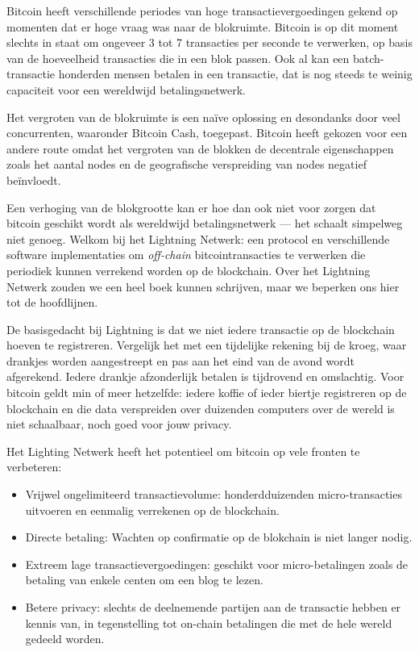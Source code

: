 \documentclass[smalldemyvopaper,11pt,twoside,onecolumn,openright,extrafontsizes]{memoir}
\begin{document}
Bitcoin heeft verschillende periodes van hoge transactievergoedingen gekend op momenten dat er hoge vraag was naar de blokruimte. Bitcoin is op dit moment slechts in staat om ongeveer 3 tot 7 transacties per seconde te verwerken, op basis van de hoeveelheid transacties die in een blok passen. Ook al kan een batch-transactie honderden mensen betalen in een transactie, dat is nog steeds te weinig capaciteit voor een wereldwijd betalingsnetwerk.    

Het vergroten van de blokruimte is een naïve oplossing en desondanks door veel concurrenten, waaronder Bitcoin Cash, toegepast. Bitcoin heeft gekozen voor een andere route omdat het vergroten van de blokken de decentrale eigenschappen zoals het aantal nodes en de geografische verspreiding van nodes negatief beïnvloedt. 

Een verhoging van de blokgrootte kan er hoe dan ook niet voor zorgen dat bitcoin geschikt wordt als wereldwijd betalingsnetwerk --- het schaalt simpelweg niet genoeg. Welkom bij het Lightning Netwerk: een protocol en verschillende software implementaties om \textit{off-chain} bitcointransacties te verwerken die periodiek kunnen verrekend worden op de blockchain. Over het Lightning Netwerk zouden we een heel boek kunnen schrijven, maar we beperken ons hier tot de hoofdlijnen.

De basisgedacht bij Lightning is dat we niet iedere transactie op de blockchain hoeven te registreren. Vergelijk het met een tijdelijke rekening bij de kroeg, waar drankjes worden aangestreept en pas aan het eind van de avond wordt afgerekend. Iedere drankje afzonderlijk betalen is tijdrovend en omslachtig. Voor bitcoin geldt min of meer hetzelfde: iedere koffie of ieder biertje registreren op de blockchain en die data verspreiden over duizenden computers over de wereld is niet schaalbaar, noch goed voor jouw privacy.

Het Lighting Netwerk heeft het potentieel om bitcoin op vele fronten te verbeteren:

\begin{itemize}
    \item Vrijwel ongelimiteerd transactievolume: honderdduizenden micro-transacties uitvoeren en eenmalig verrekenen op de blockchain. 
    
    \item Directe betaling: Wachten op confirmatie op de blokchain is niet langer nodig. 
    
    \item Extreem lage transactievergoedingen: geschikt voor micro-betalingen zoals de betaling van enkele centen om een blog te lezen. 
    
    \item Betere privacy: slechts de deelnemende partijen aan de transactie hebben er kennis van, in tegenstelling tot on-chain betalingen die met de hele wereld gedeeld worden.
    
\end{itemize}
\end{document}
